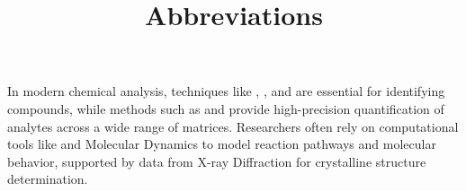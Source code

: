 \documentclass[a4paper,twoside]{article}
\title{Abbreviations}
\author{}\date{}
\begin{document}
\maketitle
In modern chemical analysis, techniques like , , and  are essential for identifying compounds, while methods such as  and  provide high-precision quantification of analytes across a wide range of matrices. Researchers often rely on computational tools like  and Molecular Dynamics to model reaction pathways and molecular behavior, supported by data from X-ray Diffraction for crystalline structure determination.

\printglossary[type=\acronymtype]
\end{document}
